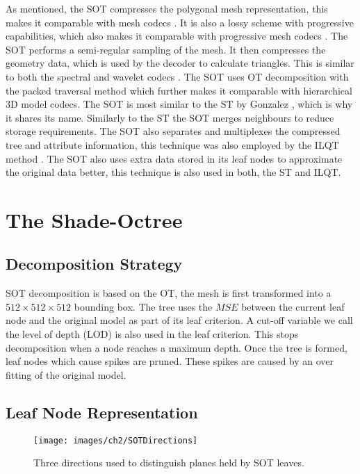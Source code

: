 As mentioned, the SOT compresses the polygonal mesh representation, this makes it comparable with mesh codecs  \cite{Siddiqui07Octree,Deering95Geometry,touma98triangle,Alliez01Valence-Driven}. It is also a lossy scheme with progressive capabilities, which also makes it comparable with progressive mesh codecs \cite{Hoppe96Progressive, Alliez01Progressive,Yemez03Multilevel, Schnabel06Otree-based}. The SOT performs a semi-regular sampling of the mesh. It then compresses the geometry data, which is used by the decoder to calculate triangles. This is similar to both the spectral and wavelet codecs \cite{Karni00Spectral, Khodakovsky00Progressive}. The SOT uses OT decomposition with the packed traversal method which further makes it comparable with hierarchical 3D model codecs. The SOT is most similar to the ST by Gonzalez \cite{Gonzalez07ShadeTree}, which is why it shares its name. Similarly to the ST the SOT merges neighbours to reduce storage requirements. The SOT also separates and multiplexes the compressed tree and attribute information, this technique was also employed by the ILQT method \cite{Lincoln13Interpolating}. The SOT also uses extra data stored in its leaf nodes to approximate the original data better, this technique is also used in both, the ST and ILQT.

\section{The Shade-Octree}

\subsection{Decomposition Strategy}

SOT decomposition is based on the OT, the mesh is first transformed into a $512\times 512\times 512$ bounding box. The tree uses the $MSE$ between the current leaf node and the original model as part of its leaf criterion. A cut-off variable we call the level of depth (LOD) is also used in the leaf criterion. This stops decomposition when a node reaches a maximum depth. Once the tree is formed, leaf nodes which cause spikes are pruned. These spikes are caused by an over fitting of the original model.

\subsection{Leaf Node Representation}

\begin{figure}[!h]
\centering
\texttt{[image: images/ch2/SOTDirections]}
\caption{Three directions used to distinguish planes held by SOT leaves.}
\label{SOTDirections}
\end{figure}


